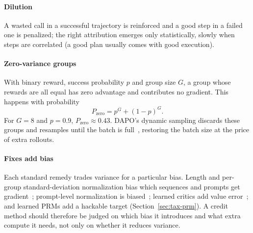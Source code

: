 \paragraph{Dilution}
A wasted call in a successful trajectory is reinforced and a good step in a failed one is penalized; the right attribution emerges only statistically, slowly when steps are correlated (a good plan usually comes with good execution).

\paragraph{Zero-variance groups}
With binary reward, success probability $p$ and group size $G$, a group whose rewards are all equal has zero advantage and contributes no gradient. This happens with probability
\begin{equation}
  P_{\text{zero}}=p^{G}+(1-p)^{G}.
  \label{eq:zerovar}
\end{equation}
For $G=8$ and $p=0.9$, $P_{\text{zero}}\approx0.43$. DAPO's dynamic sampling discards these groups and resamples until the batch is full~\citep{yu2025dapo}, restoring the batch size at the price of extra rollouts.

\paragraph{Fixes add bias}
Each standard remedy trades variance for a particular bias. Length and per-group standard-deviation normalization bias which sequences and prompts get gradient~\citep{liu2025understanding}; prompt-level normalization is biased~\citep{hu2025reinforce}; learned critics add value error~\citep{yuan2025whats}; and learned PRMs add a hackable target (Section~\ref{sec:tax-prm}). A credit method should therefore be judged on which bias it introduces and what extra compute it needs, not only on whether it reduces variance.
